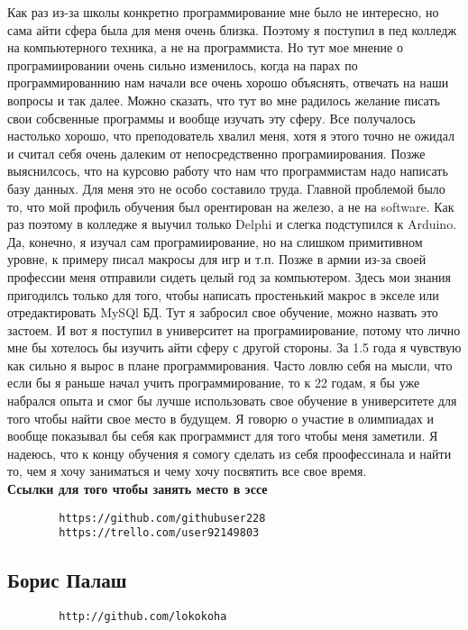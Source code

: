 \documentclass[14pt,a4paper,oneside]{extbook}
\begin{document}
		Как раз из-за школы конкретно программирование мне было не интересно, но сама айти сфера была для меня очень близка. Поэтому я поступил в пед колледж на компьютерного техника, а не на программиста. Но тут мое мнение о програмиировании очень сильно изменилось, когда на парах по программированнию нам начали все очень хорошо объяснять, отвечать на наши вопросы и так далее. Можно сказать, что тут во мне радилось желание писать свои собсвенные программы и вообще изучать эту сферу. Все получалось настолько хорошо, что преподователь хвалил меня, хотя я этого точно не ожидал и считал себя очень далеким от непосредственно програмиирования.
		Позже выяснилсось, что на курсовю работу что нам что программистам надо написать базу данных. Для меня это не особо составило труда. Главной проблемой было то, что мой профиль обучения был орентирован на железо, а не на software. Как раз поэтому в колледже я выучил только Delphi и слегка подступился к Arduino. Да, конечно, я изучал сам програмиирование, но на слишком примитивном уровне, к примеру писал макросы для игр и т.п. 
		Позже в армии из-за своей профессии меня отправили сидеть целый год за компьютером. Здесь мои знания пригодилсь только для того, чтобы написать простенький макрос в экселе или отредактировать MySQl БД. Тут я забросил свое обучение, можно назвать это застоем.
		И вот я поступил в университет на програмиирование, потому что лично мне бы хотелось бы изучить айти сферу с другой стороны. За 1.5 года я чувствую как сильно я вырос в плане программирования. Часто ловлю себя на мысли, что если бы я раньше начал учить 
		программирование, то к 22 годам, я бы уже набрался опыта и смог бы лучше использовать свое обучение в университете для того чтобы найти свое место в будущем. Я говорю о участие в олимпиадах и вообще показывал бы себя как программист для того чтобы меня заметили. Я надеюсь, что к концу обучения я сомогу сделать из себя проофессинала и найти то, чем я хочу заниматься и чему хочу посвятить все свое время.\\
		
		\noindent \textbf{Ссылки для того чтобы занять место в эссе}
		\begin{verbatim}
		https://github.com/githubuser228
		https://trello.com/user92149803
		\end{verbatim}
		
		\subsection{Борис Палаш}
		\begin{verbatim}
		http://github.com/lokokoha
		\end{verbatim}
		
\end{document}

